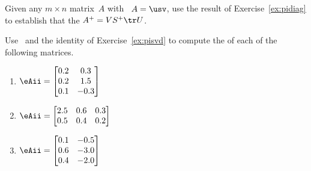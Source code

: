 \begin{exercise} \label{ex:pisvd} 
Given any \(m\times n\) matrix~\(A\) with  \svd\ \(A=\usv\), use the result of Exercise~\ref{ex:pidiag} to establish that the  \(A^+=VS^+\tr U\).
\end{exercise}







\begin{exercise} \label{ex:} 
Use \script\ and the identity of Exercise~\ref{ex:pisvd} to compute the  of each of the following matrices.
\begin{enumerate}
\item \(\eAii=\begin{bmatrix} 0.2&0.3
\\0.2&1.5
\\0.1&-0.3 \end{bmatrix}\)
\setbox\ajrqrbox\hbox{\qrcode{%
\eAii=[0.2 0.3
0.2 1.5
0.1 -0.3]
}}%
\marginpar{\usebox{\ajrqrbox\\[2ex]}}%

\item \(\eAii=\begin{bmatrix} 2.5&0.6&0.3
\\0.5&0.4&0.2 \end{bmatrix}\)
\setbox\ajrqrbox\hbox{\qrcode{%
\eAii=[2.5 0.6 0.3
0.5 0.4 0.2]
}}%
\marginpar{\usebox{\ajrqrbox\\[2ex]}}%

\item \(\eAii=\begin{bmatrix} 0.1&-0.5
\\0.6&-3.0
\\0.4&-2.0 \end{bmatrix}\)
\setbox\ajrqrbox\hbox{\qrcode{%
\eAii=[0.1 -0.5
0.6 -3.0
0.4 -2.0]
}}%
\marginpar{\usebox{\ajrqrbox\\[2ex]}}%


\end{enumerate}
\end{exercise}
